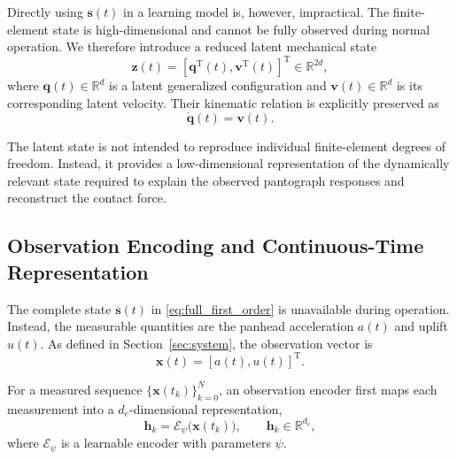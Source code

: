 \documentclass[journal,twoside]{IEEEtran}
\begin{document}
Directly using $\mathbf{s}(t)$ in a learning model is, however, impractical.
The finite-element state is high-dimensional and cannot be fully observed
during normal operation. We therefore introduce a reduced latent mechanical
state
\begin{equation}
    \mathbf{z}(t)
    =
    \left[
        \mathbf{q}^{\mathrm T}(t),
        \mathbf{v}^{\mathrm T}(t)
    \right]^{\mathrm T}
    \in\mathbb{R}^{2d},
    \label{eq:latent_state}
\end{equation}
where $\mathbf{q}(t)\in\mathbb{R}^{d}$ is a latent generalized
configuration and $\mathbf{v}(t)\in\mathbb{R}^{d}$ is its corresponding
latent velocity. Their kinematic relation is explicitly preserved as
\begin{equation}
    \dot{\mathbf{q}}(t)
    =
    \mathbf{v}(t).
    \label{eq:latent_kinematics}
\end{equation}

The latent state is not intended to reproduce individual finite-element
degrees of freedom. Instead, it provides a low-dimensional representation of
the dynamically relevant state required to explain the observed pantograph
responses and reconstruct the contact force.


\subsection{Observation Encoding and Continuous-Time Representation}
\label{subsec:observation}

The complete state $\mathbf{s}(t)$ in
\eqref{eq:full_first_order} is unavailable during operation. Instead, the
measurable quantities are the panhead acceleration $a(t)$ and uplift $u(t)$.
As defined in Section~\ref{sec:system}, the observation vector is
\begin{equation}
    \mathbf{x}(t)
    =
    \left[
        a(t),u(t)
    \right]^{\mathrm T}.
    \label{eq:method_observation}
\end{equation}

For a measured sequence
$\{\mathbf{x}(t_k)\}_{k=0}^{N}$, an observation encoder first maps each
measurement into a $d_e$-dimensional representation,
\begin{equation}
    \mathbf{h}_k
    =
    \mathcal{E}_{\psi}
    \big(
        \mathbf{x}(t_k)
    \big),
    \qquad
    \mathbf{h}_k\in\mathbb{R}^{d_e},
    \label{eq:observation_encoder}
\end{equation}
where $\mathcal{E}_{\psi}$ is a learnable encoder with parameters $\psi$.
\end{document}

